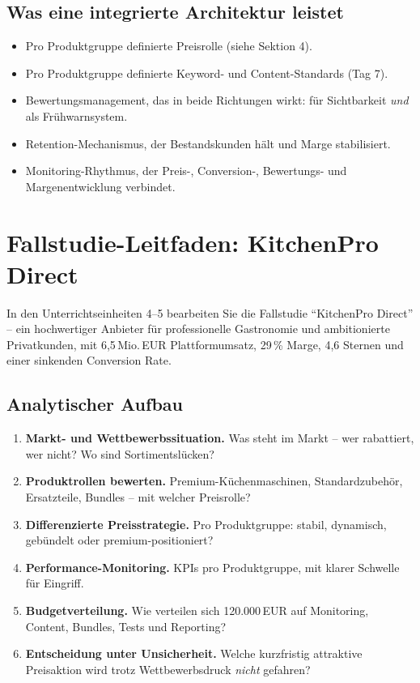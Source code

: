 \documentclass[11pt,a4paper,oneside]{article}
\begin{document}
\subsection{Was eine integrierte Architektur leistet}

\begin{itemize}
  \item Pro Produktgruppe definierte Preisrolle (siehe Sektion 4).
  \item Pro Produktgruppe definierte Keyword- und Content-Standards (Tag 7).
  \item Bewertungsmanagement, das in beide Richtungen wirkt: für Sichtbarkeit \emph{und} als Frühwarnsystem.
  \item Retention-Mechanismus, der Bestandskunden hält und Marge stabilisiert.
  \item Monitoring-Rhythmus, der Preis-, Conversion-, Bewertungs- und Margenentwicklung verbindet.
\end{itemize}

\section{Fallstudie-Leitfaden: KitchenPro Direct}

In den Unterrichtseinheiten 4--5 bearbeiten Sie die Fallstudie ``KitchenPro Direct'' -- ein hochwertiger Anbieter für professionelle Gastronomie und ambitionierte Privatkunden, mit 6{,}5\,Mio.\,EUR Plattformumsatz, 29\,\% Marge, 4{,}6 Sternen und einer sinkenden Conversion Rate.

\subsection{Analytischer Aufbau}

\begin{enumerate}
  \item \textbf{Markt- und Wettbewerbssituation.} Was steht im Markt -- wer rabattiert, wer nicht? Wo sind Sortimentslücken?
  \item \textbf{Produktrollen bewerten.} Premium-Küchenmaschinen, Standardzubehör, Ersatzteile, Bundles -- mit welcher Preisrolle?
  \item \textbf{Differenzierte Preisstrategie.} Pro Produktgruppe: stabil, dynamisch, gebündelt oder premium-positioniert?
  \item \textbf{Performance-Monitoring.} KPIs pro Produktgruppe, mit klarer Schwelle für Eingriff.
  \item \textbf{Budgetverteilung.} Wie verteilen sich 120.000\,EUR auf Monitoring, Content, Bundles, Tests und Reporting?
  \item \textbf{Entscheidung unter Unsicherheit.} Welche kurzfristig attraktive Preisaktion wird trotz Wettbewerbsdruck \emph{nicht} gefahren?
\end{enumerate}
\end{document}
